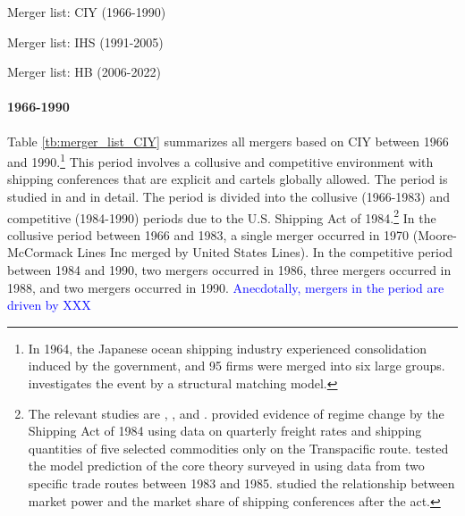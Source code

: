 \documentclass[10pt]{article}
\begin{document}
\begin{table}[!htbp]
  \begin{center}
      \caption{Merger list: CIY (1966-1990)}
      \label{tb:merger_list_CIY} 
      
  \end{center}\footnotesize
\end{table} 

\begin{table}[!htbp]
  \begin{center}
      \caption{Merger list: IHS (1991-2005)}
      \label{tb:merger_list_IHS} 
      
  \end{center}\footnotesize
\end{table} 

\begin{table}[!htbp]
  \begin{center}
      \caption{Merger list: HB (2006-2022)}
      \label{tb:merger_list_HB} 
      
  \end{center}\footnotesize
\end{table} 

\paragraph{1966-1990} 

Table \ref{tb:merger_list_CIY} summarizes all mergers based on CIY between 1966 and 1990.\footnote{In 1964, the Japanese ocean shipping industry experienced consolidation induced by the government, and 95 firms were merged into six large groups. \cite{otani2021estimating} investigates the event by a structural matching model.}
This period involves a collusive and competitive environment with shipping conferences that are explicit and cartels globally allowed. 
The period is studied in \cite{matsuda2022unified} and \cite{otani2023industry} in detail.
The period is divided into the collusive (1966-1983) and competitive (1984-1990) periods due to the U.S. Shipping Act of 1984.\footnote{The relevant studies are \cite{wilson1991some}, \cite{pirrong1992application}, and \cite{clyde1998market}. \cite{wilson1991some} provided evidence of regime change by the Shipping Act of 1984 using data on quarterly freight rates and shipping quantities of five selected commodities only on the Transpacific route. \cite{pirrong1992application} tested the model prediction of the core theory surveyed in \cite{sjostrom2013competition} using data from two specific trade routes between 1983 and 1985. \cite{clyde1998market} studied the relationship between market power and the market share of shipping conferences after the act. }
In the collusive period between 1966 and 1983, a single merger occurred in 1970 (Moore-McCormack Lines Inc merged by United States Lines). %
In the competitive period between 1984 and 1990, two mergers occurred in 1986, three mergers occurred in 1988, and two mergers occurred in 1990. 
\textcolor{blue}{Anecdotally, mergers in the period are driven by XXX}
\end{document}
